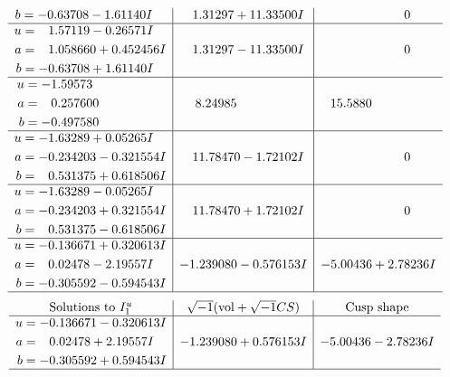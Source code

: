 \documentclass[1p]{elsarticle_modified}
\theoremstyle{definition}
\newcommand{\I}{\sqrt{-1}}
\begin{document}
$$\begin{array}{c|c|c}
\begin{aligned}
b &= -0.63708 - 1.61140 I\end{aligned}
 & \phantom{-}1.31297 + 11.33500 I & \phantom{-0.000000 } 0 \\ \hline\begin{aligned}
u &= \phantom{-}1.57119 - 0.26571 I \\
a &= \phantom{-}1.058660 + 0.452456 I \\
b &= -0.63708 + 1.61140 I\end{aligned}
 & \phantom{-}1.31297 - 11.33500 I & \phantom{-0.000000 } 0 \\ \hline\begin{aligned}
u &= -1.59573\phantom{ +0.000000I} \\
a &= \phantom{-}0.257600\phantom{ +0.000000I} \\
b &= -0.497580\phantom{ +0.000000I}\end{aligned}
 & \phantom{-}8.24985\phantom{ +0.000000I} & \phantom{-}15.5880\phantom{ +0.000000I} \\ \hline\begin{aligned}
u &= -1.63289 + 0.05265 I \\
a &= -0.234203 - 0.321554 I \\
b &= \phantom{-}0.531375 + 0.618506 I\end{aligned}
 & \phantom{-}11.78470 - 1.72102 I & \phantom{-0.000000 } 0 \\ \hline\begin{aligned}
u &= -1.63289 - 0.05265 I \\
a &= -0.234203 + 0.321554 I \\
b &= \phantom{-}0.531375 - 0.618506 I\end{aligned}
 & \phantom{-}11.78470 + 1.72102 I & \phantom{-0.000000 } 0 \\ \hline\begin{aligned}
u &= -0.136671 + 0.320613 I \\
a &= \phantom{-}0.02478 - 2.19557 I \\
b &= -0.305592 - 0.594543 I\end{aligned}
 & -1.239080 - 0.576153 I & -5.00436 + 2.78236 I\\
 \hline 
 \end{array}$$\newpage$$\begin{array}{c|c|c}  
\text{Solutions to }I^u_{1}& \I (\text{vol} + \sqrt{-1}CS) & \text{Cusp shape}\\
 \hline 
\begin{aligned}
u &= -0.136671 - 0.320613 I \\
a &= \phantom{-}0.02478 + 2.19557 I \\
b &= -0.305592 + 0.594543 I\end{aligned}
 & -1.239080 + 0.576153 I & -5.00436 - 2.78236 I\\
 \hline 
 \end{array}$$\newpage\newpage\renewcommand{\arraystretch}{1}
\end{document}
